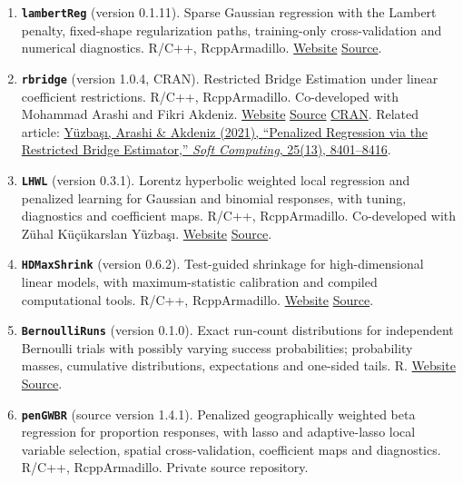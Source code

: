 \documentclass[10pt,letterpaper]{article}
\newenvironment{etaremune}{\begin{enumerate}}{\end{enumerate}}
\begin{document}
\begin{etaremune}
\item \textbf{\texttt{lambertReg}} (version 0.1.11). Sparse Gaussian regression with the Lambert penalty, fixed-shape regularization paths, training-only cross-validation and numerical diagnostics. R/C++, RcppArmadillo. \href{https://byuzbasi.github.io/lambertReg/}{Website} \textbar{} \href{https://github.com/byuzbasi/lambertReg}{Source}.

\item \textbf{\texttt{rbridge}} (version 1.0.4, CRAN). Restricted Bridge Estimation under linear coefficient restrictions. R/C++, RcppArmadillo. Co-developed with Mohammad Arashi and Fikri Akdeniz. \href{https://byuzbasi.github.io/rbridge/}{Website} \textbar{} \href{https://github.com/byuzbasi/rbridge}{Source} \textbar{} \href{https://cran.r-project.org/package=rbridge}{CRAN}. Related article: \href{https://doi.org/10.1007/s00500-021-05763-9}{Y\"{u}zba\c{s}{\i}, Arashi \& Akdeniz (2021), ``Penalized Regression via the Restricted Bridge Estimator,'' \textit{Soft Computing}, 25(13), 8401--8416}.

\item \textbf{\texttt{LHWL}} (version 0.3.1). Lorentz hyperbolic weighted local regression and penalized learning for Gaussian and binomial responses, with tuning, diagnostics and coefficient maps. R/C++, RcppArmadillo. Co-developed with Z\"{u}hal K\"{u}\c{c}\"{u}karslan Y\"{u}zba\c{s}{\i}. \href{https://byuzbasi.github.io/LHWL/}{Website} \textbar{} \href{https://github.com/byuzbasi/LHWL}{Source}.

\item \textbf{\texttt{HDMaxShrink}} (version 0.6.2). Test-guided shrinkage for high-dimensional linear models, with maximum-statistic calibration and compiled computational tools. R/C++, RcppArmadillo. \href{https://byuzbasi.github.io/HDMaxShrink/}{Website} \textbar{} \href{https://github.com/byuzbasi/HDMaxShrink}{Source}.

\item \textbf{\texttt{BernoulliRuns}} (version 0.1.0). Exact run-count distributions for independent Bernoulli trials with possibly varying success probabilities; probability masses, cumulative distributions, expectations and one-sided tails. R. \href{https://byuzbasi.github.io/BernoulliRuns/}{Website} \textbar{} \href{https://github.com/byuzbasi/BernoulliRuns}{Source}.

\item \textbf{\texttt{penGWBR}} (source version 1.4.1). Penalized geographically weighted beta regression for proportion responses, with lasso and adaptive-lasso local variable selection, spatial cross-validation, coefficient maps and diagnostics. R/C++, RcppArmadillo. Private source repository.


\end{etaremune}
\end{document}
